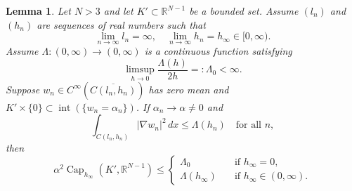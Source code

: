 \documentclass{article}
\numberwithin{equation}{section}
\newtheorem{lemma}[theorem]{Lemma}
\theoremstyle{definition}
\theoremstyle{remark}
\newcommand{\cpct}{\operatorname{Cap}}
\newcommand{\topint}{\operatorname{int}}
\begin{document}
\begin{lemma} \label{lm:finite_height}
    Let $N > 3$ and let $K' \subset \mathbb{R}^{N - 1}$ be a bounded set. Assume $(l_n)$ and $(h_n)$ are sequences of real numbers such that
    \[
    \lim_{n \to \infty} l_n = \infty, \quad \lim_{n \to \infty} h_n = h_\infty \in [0, \infty).
    \]
    Assume $\Lambda : (0, \infty) \rightarrow (0, \infty)$ is a continuous function satisfying
    \[
    \limsup_{h \to 0} \frac{\Lambda(h)}{2h} =: \Lambda_0 < \infty.
    \]
    Suppose $w_n \in C^\infty(\overline{C(l_n, h_n)})$ has zero mean and $K' \times \{0\} \subset \topint(\{w_n = \alpha_n\})$. If $\alpha_n \to \alpha \neq 0$ and
    \begin{equation} \label{eq:lambda_bound}
        \int_{C(l_n, h_n)} |\nabla w_n|^2 \, dx \le \Lambda(h_n) \quad \text{for all } n,
    \end{equation}
    then
    \[
    \alpha^2 \cpct_{h_\infty}(K', \mathbb{R}^{N - 1}) \le 
    \begin{cases}
        \Lambda_0 \quad &\text{if } h_\infty = 0, \\
        \Lambda(h_\infty) \quad &\text{if } h_\infty \in (0, \infty).
    \end{cases}
    \]
\end{lemma}
\end{document}
